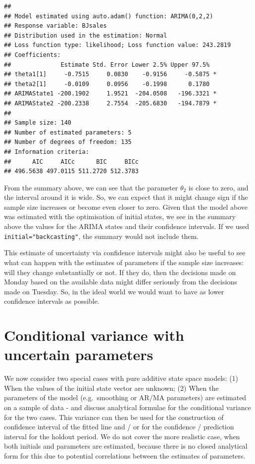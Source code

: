 \documentclass[
]{book}
\theoremstyle{definition}
\theoremstyle{definition}
\theoremstyle{definition}
\theoremstyle{definition}
\theoremstyle{remark}
\begin{document}
\begin{verbatim}
## 
## Model estimated using auto.adam() function: ARIMA(0,2,2)
## Response variable: BJsales
## Distribution used in the estimation: Normal
## Loss function type: likelihood; Loss function value: 243.2819
## Coefficients:
##              Estimate Std. Error Lower 2.5% Upper 97.5%  
## theta1[1]     -0.7515     0.0830    -0.9156     -0.5875 *
## theta2[1]     -0.0109     0.0956    -0.1998      0.1780  
## ARIMAState1 -200.1902     1.9521  -204.0508   -196.3321 *
## ARIMAState2 -200.2338     2.7554  -205.6830   -194.7879 *
## 
## Sample size: 140
## Number of estimated parameters: 5
## Number of degrees of freedom: 135
## Information criteria:
##      AIC     AICc      BIC     BICc 
## 496.5638 497.0115 511.2720 512.3783
\end{verbatim}

From the summary above, we can see that the parameter \(\theta_2\) is close to zero, and the interval around it is wide. So, we can expect that it might change sign if the sample size increases or become even closer to zero. Given that the model above was estimated with the optimisation of initial states, we see in the summary above the values for the ARIMA states and their confidence intervals. If we used \texttt{initial="backcasting"}, the summary would not include them.

This estimate of uncertainty via confidence intervals might also be useful to see what can happen with the estimates of parameters if the sample size increases: will they change substantially or not. If they do, then the decisions made on Monday based on the available data might differ seriously from the decisions made on Tuesday. So, in the ideal world we would want to have as lower confidence intervals as possible.

\hypertarget{conditional-variance-with-uncertain-parameters}{%
\section{Conditional variance with uncertain parameters}\label{conditional-variance-with-uncertain-parameters}}

We now consider two special cases with pure additive state space models: (1) When the values of the initial state vector are unknown; (2) When the parameters of the model (e.g.~smoothing or AR/MA parameters) are estimated on a sample of data - and discuss analytical formulae for the conditional variance for the two cases. This variance can then be used for the construction of confidence interval of the fitted line and / or for the confidence / prediction interval for the holdout period. We do not cover the more realistic case, when both initials and parameters are estimated, because there is no closed analytical form for this due to potential correlations between the estimates of parameters.
\end{document}
